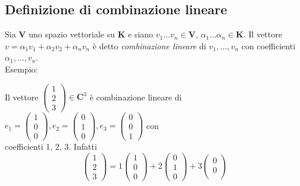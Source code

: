 \documentclass[12pt]{article}
\begin{document}
\subsection{Definizione di combinazione lineare}

Sia $\mathbf{V}$ uno spazio vettoriale su $\mathbf{K}$ e siano $v_1 \dots v_n \in \mathbf{V}$, $\alpha_1 \dots \alpha_n \in \mathbf{K}$. Il vettore $v = \alpha_1v_1 + \alpha_2v_2 + \alpha_nv_n$ è detto \textit{combinazione lineare} di $v_1, \dots, v_n$ con coefficienti $\alpha_1, \dots, v_n$.\\
Esempio:
\begin{center}
    Il vettore $\begin{pmatrix}
        1\\
        2\\
        3
    \end{pmatrix} \in \mathbf{C}^3$ è combinazione lineare di\\
    $e_1 = \begin{pmatrix}
        1\\
        0\\
        0
    \end{pmatrix}, e_2 = \begin{pmatrix}
        0\\
        1\\
        0
    \end{pmatrix}, e_3 = \begin{pmatrix}
        0\\
        0\\
        1
    \end{pmatrix}$ con\\
    coefficienti 1, 2, 3. Infatti
    \[\begin{pmatrix}
        1\\
        2\\
        3
    \end{pmatrix} = 1\begin{pmatrix}
        1\\
        0\\
        0
    \end{pmatrix} + 2\begin{pmatrix}
        0\\
        1\\
        0
    \end{pmatrix} + 3\begin{pmatrix}
        0\\
        0\\

\end{pmatrix}\]
\end{center}
\end{document}
